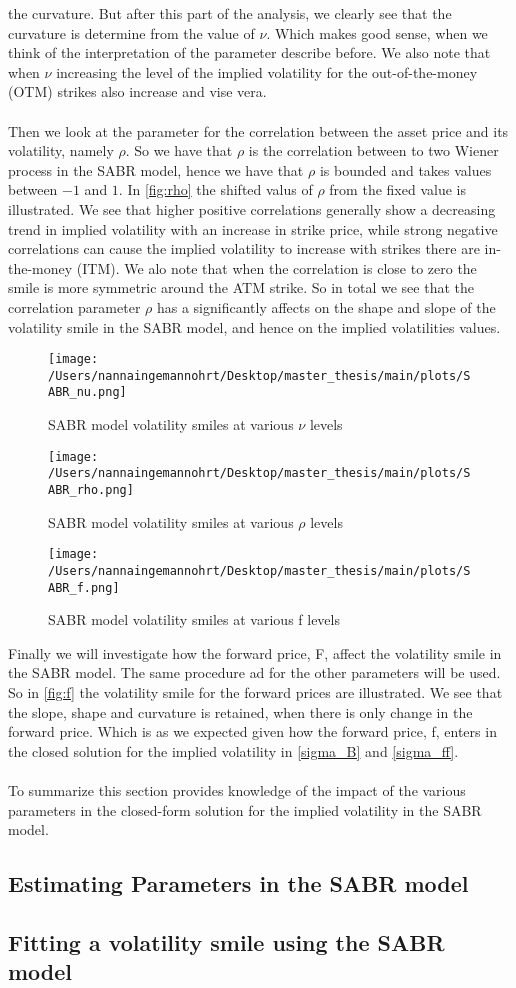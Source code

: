the curvature. But after this part of the analysis, we clearly see that the curvature is determine from the value
of $\nu$. Which makes good sense, when we think of the interpretation of the parameter describe before.
We also note that when $\nu$  increasing the level of the implied volatility for the 
out-of-the-money (OTM) strikes also increase and vise vera.
\\\\
Then we look at the parameter for the correlation between the asset price and its volatility, namely $\rho$.
So we have that $\rho$ is the correlation between to two Wiener process in the SABR model, hence we have
that $\rho$ is bounded and takes values between $-1$ and $1$. In \autoref{fig:rho} the shifted valus of $\rho$
from the fixed value is illustrated. 
We see that higher positive correlations generally show a decreasing trend in implied volatility with an increase in strike price, 
while strong negative correlations can cause the implied volatility to increase with strikes there are in-the-money (ITM).
We alo note that when the correlation is close to zero the smile is more symmetric around the ATM strike. 
So in total we see that the correlation parameter $\rho$ has a significantly affects on the shape and slope of
the volatility smile in the SABR model, and hence on the implied volatilities values.
\begin{figure}[htbp]
    \centering
    \texttt{[image: /Users/nannaingemannohrt/Desktop/master\_thesis/main/plots/SABR\_nu.png]}
    \caption{SABR model volatility smiles at various $\nu$ levels}
    \label{fig:nu}
\end{figure}

\begin{figure}[htbp]
    \centering
    \texttt{[image: /Users/nannaingemannohrt/Desktop/master\_thesis/main/plots/SABR\_rho.png]}
    \caption{SABR model volatility smiles at various $\rho$ levels}
    \label{fig:rho}
\end{figure}

\begin{figure}[htbp]
    \centering
    \texttt{[image: /Users/nannaingemannohrt/Desktop/master\_thesis/main/plots/SABR\_f.png]}
    \caption{SABR model volatility smiles at various f levels}
    \label{fig:f}
\end{figure}
\newpage
\noindent
Finally we will investigate how the forward price, F, affect the volatility smile in the SABR model. 
The same procedure ad for the other parameters will be used. So in \autoref{fig:f} the volatility smile
for the forward prices are illustrated. We see that the slope, shape and curvature is retained, when there
is only change in the forward price. Which is as we expected given how the forward price, f, enters in the closed
solution for the implied volatility in \autoref{sigma_B} and \autoref{sigma_ff}.
\\\\
To summarize this section provides knowledge of the impact of the various parameters in the closed-form solution
for the implied volatility in the SABR model. 
\newpage
\subsection{Estimating Parameters in the SABR model}
\subsection{Fitting a volatility smile using the SABR model}